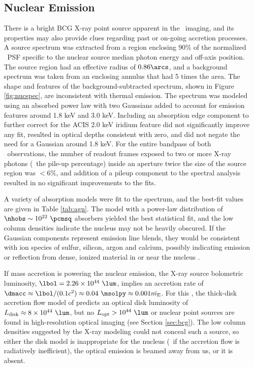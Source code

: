 \documentclass[11pt, preprint]{aastex}
\begin{document}
\subsection{Nuclear Emission}
\label{sec:nuc}

There is a bright BCG X-ray point source apparent in the
\cxo\ imaging, and its properties may also provide clues regarding
past or on-going accretion processes. A source spectrum was extracted
from a region enclosing 90\% of the normalized \cxo\ PSF specific to
the nuclear source median photon energy and off-axis position. The
source region had an effective radius of $0.86\arcs$, and a background
spectrum was taken from an enclosing annulus that had 5 times the
area. The shape and features of the background-subtracted spectrum,
shown in Figure \ref{fig:nucspec}, are inconsistent with thermal
emission. The spectrum was modeled using an absorbed power law with
two Gaussians added to account for emission features around 1.8 keV
and 3.0 keV. Including an absorption edge component to further correct
for the ACIS 2.0 keV iridium feature did not significantly improve any
fit, resulted in optical depths consistent with zero, and did not
negate the need for a Gaussian around 1.8 keV. For the entire bandpass
of both \cxo\ observations, the number of readout frames exposed to
two or more X-ray photons (\ie\ the pile-up percentage) inside an
aperture twice the size of the source region was $< 6\%$, and addition
of a pileup component to the spectral analysis resulted in no
significant improvements to the fits.

A variety of absorption models were fit to the spectrum, and the
best-fit values are given in Table \ref{tab:agn}. The model with a
power-law distribution of $\nhobs \sim 10^{22} ~\pcmsq$ absorbers
yielded the best statistical fit, and the low column densities
indicate the nucleus may not be heavily obscured. If the Gaussian
components represent emission line blends, they would be consistent
with ion species of sulfur, silicon, argon and calcium, possibly
indicating emission or reflection from dense, ionized material in or
near the nucleus \citep[\eg][]{1990ApJ...362...90B,
  1998MNRAS.297.1219I}.

If mass accretion is powering the nuclear emission, the X-ray source
bolometric luminosity, $\lbol = 2.26 \times 10^{44} ~\lum$, implies an
accretion rate of $\dmacc \approx \lbol/(0.1 c^2) \approx 0.04
~\msolpy \approx 0.001 \dme$. For this \dmacc, the thick-disk
accretion flow model of \citet{2002NewAR..46..247M} predicts an
optical disk luminosity of $\ldisk \approx 8 \times 10^{44} ~\lum$,
but no $L_{\rm{opt}} > 10^{44} ~\lum$ or nuclear point sources are
found in high-resolution optical imaging (see Section
\ref{sec:bcg}). The low column densities suggested by the X-ray
modeling could not conceal such a source, so either the disk model is
inappropriate for the nucleus (\eg\ if the accretion flow is
radiatively inefficient), the optical emission is beamed away from us,
or it is absent.
\end{document}
